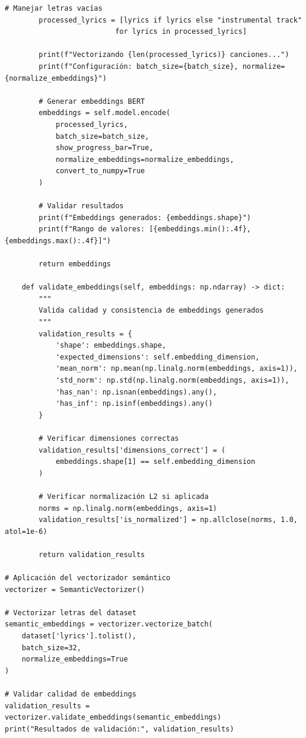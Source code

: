 \documentclass[12pt,a4paper]{report}
\begin{document}
\begin{lstlisting}[caption={Pipeline Completa de Vectorización Semántica BERT}]
        # Manejar letras vacías
        processed_lyrics = [lyrics if lyrics else "instrumental track"
                          for lyrics in processed_lyrics]

        print(f"Vectorizando {len(processed_lyrics)} canciones...")
        print(f"Configuración: batch_size={batch_size}, normalize={normalize_embeddings}")

        # Generar embeddings BERT
        embeddings = self.model.encode(
            processed_lyrics,
            batch_size=batch_size,
            show_progress_bar=True,
            normalize_embeddings=normalize_embeddings,
            convert_to_numpy=True
        )

        # Validar resultados
        print(f"Embeddings generados: {embeddings.shape}")
        print(f"Rango de valores: [{embeddings.min():.4f}, {embeddings.max():.4f}]")

        return embeddings

    def validate_embeddings(self, embeddings: np.ndarray) -> dict:
        """
        Valida calidad y consistencia de embeddings generados
        """
        validation_results = {
            'shape': embeddings.shape,
            'expected_dimensions': self.embedding_dimension,
            'mean_norm': np.mean(np.linalg.norm(embeddings, axis=1)),
            'std_norm': np.std(np.linalg.norm(embeddings, axis=1)),
            'has_nan': np.isnan(embeddings).any(),
            'has_inf': np.isinf(embeddings).any()
        }

        # Verificar dimensiones correctas
        validation_results['dimensions_correct'] = (
            embeddings.shape[1] == self.embedding_dimension
        )

        # Verificar normalización L2 si aplicada
        norms = np.linalg.norm(embeddings, axis=1)
        validation_results['is_normalized'] = np.allclose(norms, 1.0, atol=1e-6)

        return validation_results

# Aplicación del vectorizador semántico
vectorizer = SemanticVectorizer()

# Vectorizar letras del dataset
semantic_embeddings = vectorizer.vectorize_batch(
    dataset['lyrics'].tolist(),
    batch_size=32,
    normalize_embeddings=True
)

# Validar calidad de embeddings
validation_results = vectorizer.validate_embeddings(semantic_embeddings)
print("Resultados de validación:", validation_results)
\end{lstlisting}
\end{document}
